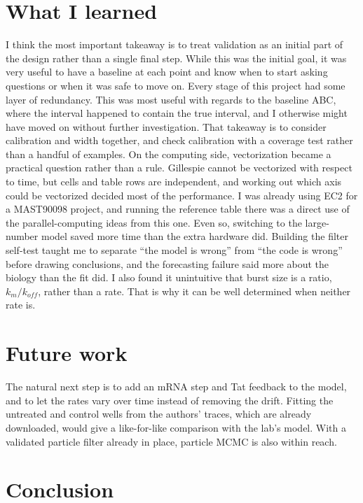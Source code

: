 \section{What I learned}\label{sec:disc-learning}

I think the most important takeaway is to treat validation as an initial part of the design rather than a single final step. While this was the initial goal, it was very useful to have a baseline at each point and know when to start asking questions or when it was safe to move on. Every stage of this project had some layer of redundancy. This was most useful with regards to the baseline ABC, where the interval happened to contain the true interval, and I otherwise might have moved on without further investigation. That takeaway is to consider calibration and width together, and check calibration with a coverage test rather than a handful of examples. On the computing side, vectorization became a practical question rather than a rule. Gillespie cannot be vectorized with respect to time, but cells and table rows are independent, and working out which axis could be vectorized decided most of the performance. I was already using EC2 for a MAST90098 project, and running the reference table there was a direct use of the parallel-computing ideas from this one. Even so, switching to the large-number model saved more time than the extra hardware did. Building the filter self-test taught me to separate ``the model is wrong'' from ``the code is wrong'' before drawing conclusions, and the forecasting failure said more about the biology than the fit did. I also found it unintuitive that burst size is a ratio, $k_m/k_{off}$, rather than a rate. That is why it can be well determined when neither rate is.

\section{Future work}\label{sec:disc-future}

The natural next step is to add an mRNA step and Tat feedback to the model, and to let the rates vary over time instead of removing the drift. Fitting the untreated and control wells from the authors' traces, which are already downloaded, would give a like-for-like comparison with the lab's model. With a validated particle filter already in place, particle MCMC is also within reach.

\section{Conclusion}\label{sec:conclusion}


